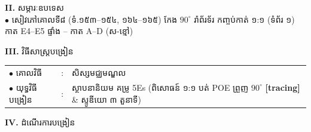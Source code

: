 \documentclass[a4paper,10pt]{article}
\newcommand{\cnum}[1]{{\fontsize{10.5pt}{12pt}\selectfont\ding{\numexpr181+#1\relax}}\hspace{0.2em}}
\begin{document}
{\vspace{1pt}

\textbf{II.} {\muol សម្ភារៈឧបទេស}\\[1pt]
\hspace*{0.55cm}$\bullet$ \hspace{0.35cm} សៀវភៅគោលទី៨ (ទំ.១៥៣--១៥៤, ១៦៤--១៦៥) កែង $90^\circ$ រ៉ាព័រទ័រ កញ្ចប់កាត់ ១:១ (ទំព័រ ១) កាត E4--E5 ផ្ទាំង \cnum{1}--\cnum{5} កាត A--D (ស-ខ្មៅ)

\vspace{1pt}

\textbf{III.} {\muol វិធីសាស្រ្តបង្រៀន}\\[1pt]
\hspace*{0.55cm}%
\begin{tabular}{@{}l l l@{}}
  $\bullet$ \hspace{0.35cm} គោលវិធី & : \hspace{0.7cm} & សិស្សមជ្ឈមណ្ឌល \\
  $\bullet$ \hspace{0.35cm} យុទ្ធវិធីបង្រៀន & : & ស្ថាបនានិយម គម្រូ 5Es (ពិសោធន៍ ១:១ បត់ POE ព្រួញ $90^\circ$ \textbf{[tracing]} \& ស្ទូឌីយោ ៣ តួនាទី) \\
\end{tabular}
}

\vspace{1pt}

\textbf{IV.} {\muol ដំណើរការបង្រៀន}
\end{document}
